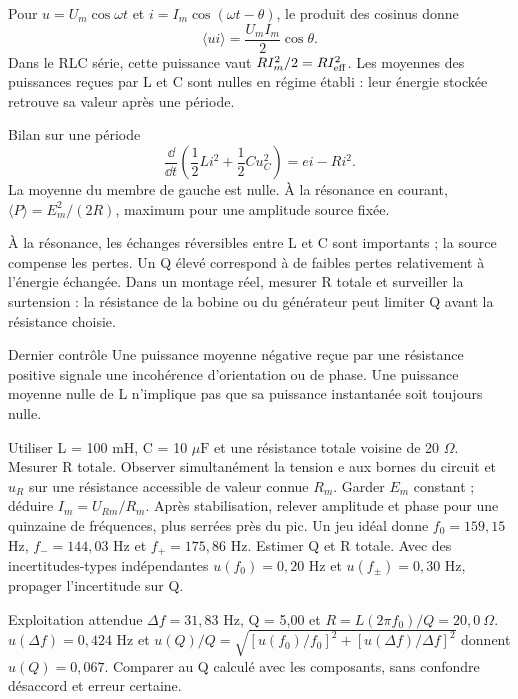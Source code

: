 Pour $u=U_m\cos\omega t$ et $i=I_m\cos(\omega t-\theta)$, le produit des cosinus donne\[\langle ui\rangle=\frac{U_m I_m}2\cos\theta.\]Dans le RLC série, cette puissance vaut $RI_m^2/2=RI_{\rm eff}^2$. Les moyennes des puissances reçues par L et C sont nulles en régime établi : leur énergie stockée retrouve sa valeur après une période.
\begin{loi}{Bilan sur une période}
\[\frac{\dd}{\dd t}\left(\frac12Li^2+\frac12Cu_C^2\right)=ei-Ri^2.\]La moyenne du membre de gauche est nulle. À la résonance en courant, $\langle P\rangle=E_m^2/(2R)$, maximum pour une amplitude source fixée.
\end{loi}
À la résonance, les échanges réversibles entre L et C sont importants ; la source compense les pertes. Un Q élevé correspond à de faibles pertes relativement à l’énergie échangée. Dans un montage réel, mesurer R totale et surveiller la surtension : la résistance de la bobine ou du générateur peut limiter Q avant la résistance choisie.
\begin{methode}{Dernier contrôle}
Une puissance moyenne négative reçue par une résistance positive signale une incohérence d’orientation ou de phase. Une puissance moyenne nulle de L n’implique pas que sa puissance instantanée soit toujours nulle.
\end{methode}


Utiliser L = 100 mH, C = 10 $\mu\mathrm F$ et une résistance totale voisine de 20 $\Omega$. Mesurer R totale. Observer simultanément la tension e aux bornes du circuit et $u_R$ sur une résistance accessible de valeur connue $R_m$. Garder $E_m$ constant ; déduire $I_m=U_{Rm}/R_m$. Après stabilisation, relever amplitude et phase pour une quinzaine de fréquences, plus serrées près du pic.
Un jeu idéal donne $f_0=159{,}15$ Hz, $f_-=144{,}03$ Hz et $f_+=175{,}86$ Hz. Estimer Q et R totale. Avec des incertitudes-types indépendantes $u(f_0)=0{,}20$ Hz et $u(f_\pm)=0{,}30$ Hz, propager l’incertitude sur Q.
\begin{methode}{Exploitation attendue}
$\Delta f=31{,}83$ Hz, Q = 5,00 et $R=L(2\pi f_0)/Q=20{,}0\ \Omega$. $u(\Delta f)=0{,}424$ Hz et $u(Q)/Q=\sqrt{[u(f_0)/f_0]^2+[u(\Delta f)/\Delta f]^2}$ donnent $u(Q)=0{,}067$. Comparer au Q calculé avec les composants, sans confondre désaccord et erreur certaine.
\end{methode}


